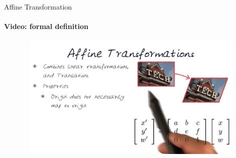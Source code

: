 \documentclass[aspectratio=169]{beamer}
\begin{document}
\begin{frame}[t]{Affine Transformation}
    \framesubtitle{Video: formal definition}
    \vspace{-0.6cm}
    \begin{figure}[H]
        \href{https://www.youtube.com/watch?v=il6Z5LCykZk}{
            \centering\includegraphics[height=6cm,width=1\textwidth,keepaspectratio]{formal_def.jpg}}
        \label{fig:formal_def.jpg}
    \end{figure}
\end{frame}
\end{document}
